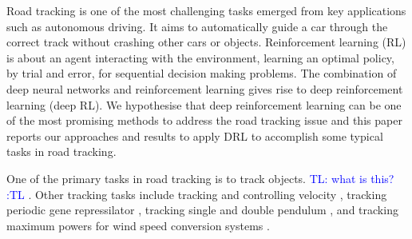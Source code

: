 \documentclass{svproc}
\newcommand{\tl}[1]{\textcolor{blue} {TL: #1 :TL} }
\begin{document}
Road tracking is one of the most challenging tasks emerged from key applications such as autonomous driving. It aims to automatically guide a car through the correct track without crashing other cars or objects.  
Reinforcement learning (RL) is about an agent interacting with the environment, learning an optimal policy, by trial and error, for sequential decision making problems.
%
The combination of deep neural networks and reinforcement learning gives rise to deep
reinforcement learning (deep RL). We hypothesise that deep reinforcement learning %
can be one of the most promising %
methods %
to address 
the road tracking issue and this paper %
reports our approaches and results to apply DRL to accomplish some typical tasks in road tracking. 


One of the primary tasks in road tracking is to track objects. \tl{what is this?} \cite{Grigore2000Reinforcement,Cohen2010Reinforcement,Liu2004Reinforcement,Supancic2017Tracking}. %
Other tracking tasks include tracking and controlling velocity \cite{Jinlin2009Neurofuzzy}, tracking periodic gene repressilator \cite{Sootla2013On}, tracking single and double pendulum \cite{Hall2011Reinforcement}, and tracking maximum powers for wind speed conversion systems \cite{Wei2015Reinforcement}. 
\end{document}
